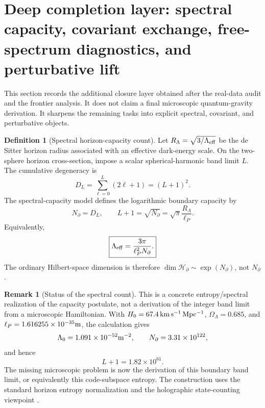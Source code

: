 \documentclass[aps,prd,reprint,nofootinbib,superscriptaddress,floatfix]{revtex4-2}
\numberwithin{equation}{section}
\theoremstyle{definition}
\newtheorem{definition}{Definition}[section]
\newtheorem{remark}{Remark}[section]
\theoremstyle{plain}
\newcommand{\Ncap}{N_{\partial}}
\newcommand{\Hbd}{\mathcal H_{\partial}}
\begin{document}
\section{Deep completion layer: spectral capacity, covariant exchange, free-spectrum diagnostics, and perturbative lift}
\label{sec:deep-completion}

This section records the additional closure layer obtained after the real-data audit and the frontier analysis.  It does not claim a final microscopic quantum-gravity derivation.  It sharpens the remaining tasks into explicit spectral, covariant, and perturbative objects.

\begin{definition}[Spectral horizon-capacity count]
Let \(R_\Lambda=\sqrt{3/\Lambda_{\rm eff}}\) be the de Sitter horizon radius associated with an effective dark-energy scale.  On the two-sphere horizon cross-section, impose a scalar spherical-harmonic band limit \(L\).  The cumulative degeneracy is
\begin{equation}
D_L=\sum_{\ell=0}^{L}(2\ell+1)=(L+1)^2 .
\end{equation}
The spectral-capacity model defines the logarithmic boundary capacity by
\begin{equation}
\boxed{
\Ncap=D_L,\qquad
L+1=\sqrt{\Ncap}=\sqrt{\pi}\frac{R_\Lambda}{\ell_P}.
}
\end{equation}
Equivalently,
\begin{equation}
\boxed{
\Lambda_{\rm eff}
=
\frac{3\pi}{\ell_P^2\Ncap}.
}
\end{equation}
The ordinary Hilbert-space dimension is therefore \(\dim\Hbd\sim\exp(\Ncap)\), not \(\Ncap\).
\end{definition}

\begin{remark}[Status of the spectral count]
This is a concrete entropy/spectral realization of the capacity postulate, not a derivation of the integer band limit from a microscopic Hamiltonian.  With \(H_0=67.4\,{\rm km\,s^{-1}\,Mpc^{-1}}\), \(\Omega_\Lambda=0.685\), and \(\ell_P=1.616255\times10^{-35}{\rm m}\), the calculation gives
\begin{equation}
\Lambda_0=1.091\times10^{-52}{\rm m}^{-2},\qquad
\Ncap=3.31\times10^{122},
\end{equation}
and hence
\begin{equation}
L+1=1.82\times10^{61}.
\end{equation}
The missing microscopic problem is now the derivation of this boundary band limit, or equivalently this code-subspace entropy.  The construction uses the standard horizon entropy normalization and the holographic state-counting viewpoint \cite{GibbonsHawking1977,Bousso2002}.
\end{remark}
\end{document}
